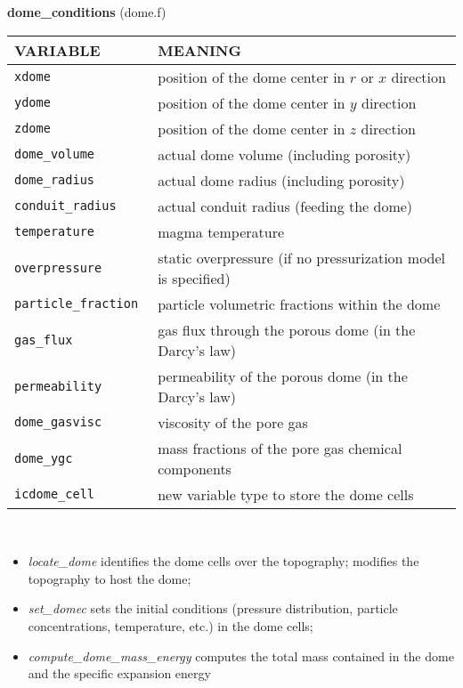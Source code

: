%
%
{\large {\bf dome\_conditions}} (dome.f)\\[5mm]
\begin{tabular}{|p{6cm}|p{6cm}|}\hline
VARIABLE & MEANING\\\hline
\tt  xdome    & position of the dome center in $r$ or $x$ direction\\\hline
\tt  ydome    & position of the dome center in $y$ direction\\\hline
\tt  zdome    & position of the dome center in $z$ direction\\\hline
\tt  dome\_volume  & actual dome volume (including porosity) \\\hline
\tt  dome\_radius  & actual dome radius (including porosity) \\\hline
\tt  conduit\_radius  & actual conduit radius (feeding the dome) \\\hline
\tt  temperature  & magma temperature \\\hline
\tt  overpressure & static overpressure (if no pressurization model is specified) \\\hline
\tt  particle\_fraction   & particle volumetric fractions within the dome\\\hline
\tt  gas\_flux    & gas flux through the porous dome (in the Darcy's law)\\\hline
\tt  permeability & permeability of the porous dome (in the Darcy's law) \\\hline
\tt  dome\_gasvisc & viscosity of the pore gas\\\hline
\tt  dome\_ygc     & mass fractions of the pore gas chemical components\\\hline
\tt  icdome\_cell  & new variable type to store the dome cells\\\hline
\end{tabular}\\%
\begin{itemize}
\item{\em locate\_dome} identifies the dome cells over the topography; modifies the topography to host the dome;
\item{\em set\_domec} sets the initial conditions (pressure distribution, particle concentrations, temperature, etc.)
in the dome cells;
\item{\em compute\_dome\_mass\_energy} computes the total mass contained in the dome and the specific expansion energy
\end{itemize}
